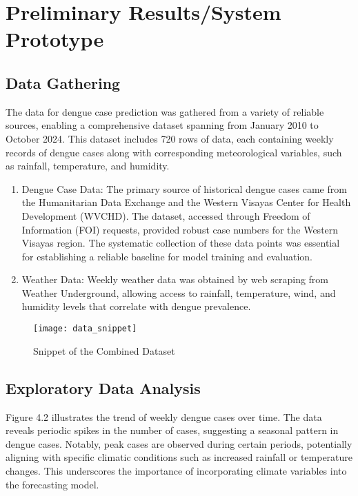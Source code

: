 \chapter{Preliminary Results/System Prototype}
\section{Data Gathering}
The data for dengue case prediction was gathered from a variety of reliable sources, enabling a comprehensive dataset spanning from January 2010 to October 2024. This dataset includes 720 rows of data, each containing weekly records of dengue cases along with corresponding meteorological variables, such as rainfall, temperature, and humidity.
\begin{enumerate}
	\item Dengue Case Data: The primary source of historical dengue cases came from the Humanitarian Data Exchange and the Western Visayas Center for Health Development (WVCHD). The dataset, accessed through Freedom of Information (FOI) requests, provided robust case numbers for the Western Visayas region. The systematic collection of these data points was essential for establishing a reliable baseline for model training and evaluation.
	\item Weather Data: Weekly weather data was obtained by web scraping from Weather Underground, allowing access to rainfall, temperature, wind, and humidity levels that correlate with dengue prevalence.
\end{enumerate}

\begin{figure}[ht]
	\centering
	\texttt{[image: data\_snippet]}
	\caption{Snippet of the Combined Dataset}
	\label{fig:data_snippet}
\end{figure}

\section{Exploratory Data Analysis}

Figure 4.2 illustrates the trend of weekly dengue cases over time. The data reveals periodic spikes in the number of cases, suggesting a seasonal pattern in dengue cases. Notably, peak cases are observed during certain periods, potentially aligning with specific climatic conditions such as increased rainfall or temperature changes. This underscores the importance of incorporating climate variables into the forecasting model.


